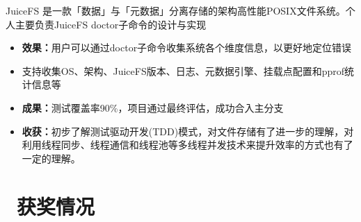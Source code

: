 \documentclass{resume}
\begin{document}
JuiceFS 是一款「数据」与「元数据」分离存储的架构高性能POSIX文件系统。个人主要负责JuiceFS doctor子命令的设计与实现
\begin{onehalfspacing}
\begin{itemize}
  \item \textbf{效果：}用户可以通过doctor子命令收集系统各个维度信息，以更好地定位错误
  \item 支持收集OS、架构、JuiceFS版本、日志、元数据引擎、挂载点配置和pprof统计信息等
  \item \textbf{成果：}测试覆盖率90\%，项目通过最终评估，成功合入主分支
  \item \textbf{收获：}初步了解测试驱动开发(TDD)模式，对文件存储有了进一步的理解，对利用线程同步、线程通信和线程池等多线程并发技术来提升效率的方式也有了一定的理解。
\end{itemize}
\end{onehalfspacing}


\section{\faHeartO\ 获奖情况}



\end{document}
